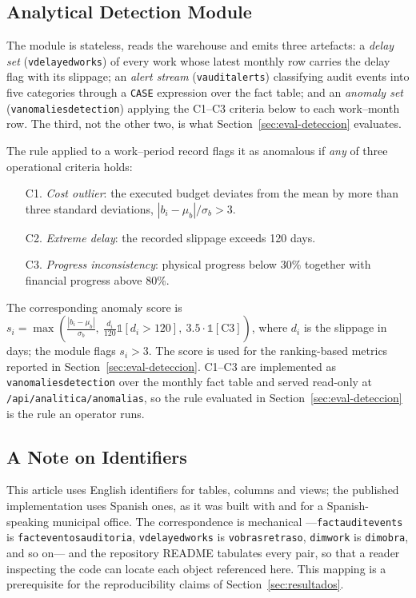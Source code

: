 \documentclass[runningheads]{llncs}
\renewcommand{\_}{\origunderscore\allowbreak}
\begin{document}
\subsection{Analytical Detection Module}
\label{sec:modulo-deteccion}
\begingroup
The module is stateless, reads the warehouse and emits three artefacts: a \emph{delay set} (\texttt{v\_delayed\_works}) of every work whose latest monthly row carries the delay flag with its slippage; an \emph{alert stream} (\texttt{v\_audit\_alerts}) classifying audit events into five categories through a \texttt{CASE} expression over the fact table; and an \emph{anomaly set} (\texttt{v\_anomalies\_detection}) applying the C1--C3 criteria below to each work--month row. The third, not the other two, is what Section~\ref{sec:eval-deteccion} evaluates.

The rule applied to a work--period record flags it as anomalous if \emph{any} of three operational criteria holds:
\begin{enumerate}
\item[C1.] \emph{Cost outlier}: the executed budget deviates from the mean by more than three standard deviations, $|b_i-\mu_b|/\sigma_b > 3$.
\item[C2.] \emph{Extreme delay}: the recorded slippage exceeds 120 days.
\item[C3.] \emph{Progress inconsistency}: physical progress below 30\% together with financial progress above 80\%.
\end{enumerate}
The corresponding anomaly score is $s_i=\max\left(\frac{|b_i-\mu_b|}{\sigma_b},\ \frac{d_i}{120}\mathbb{1}[d_i>120],\ 3.5\cdot\mathbb{1}[\text{C3}]\right)$, where $d_i$ is the slippage in days; the module flags $s_i>3$. The score is used for the ranking-based metrics reported in Section~\ref{sec:eval-deteccion}. C1--C3 are implemented as \texttt{v\_anomalies\_detection} over the monthly fact table and served read-only at \texttt{/api/analitica/anomalias}, so the rule evaluated in Section~\ref{sec:eval-deteccion} is the rule an operator runs.
\endgroup

\subsection{A Note on Identifiers}
\label{sec:naming}
\begingroup
This article uses English identifiers for tables, columns and views; the published implementation uses Spanish ones, as it was built with and for a Spanish-speaking municipal office. The correspondence is mechanical ---\texttt{fact\_audit\_events} is \texttt{fact\_eventos\_auditoria}, \texttt{v\_delayed\_works} is \texttt{v\_obras\_retraso}, \texttt{dim\_work} is \texttt{dim\_obra}, and so on--- and the repository README tabulates every pair, so that a reader inspecting the code can locate each object referenced here. This mapping is a prerequisite for the reproducibility claims of Section~\ref{sec:resultados}.
\endgroup
\end{document}
